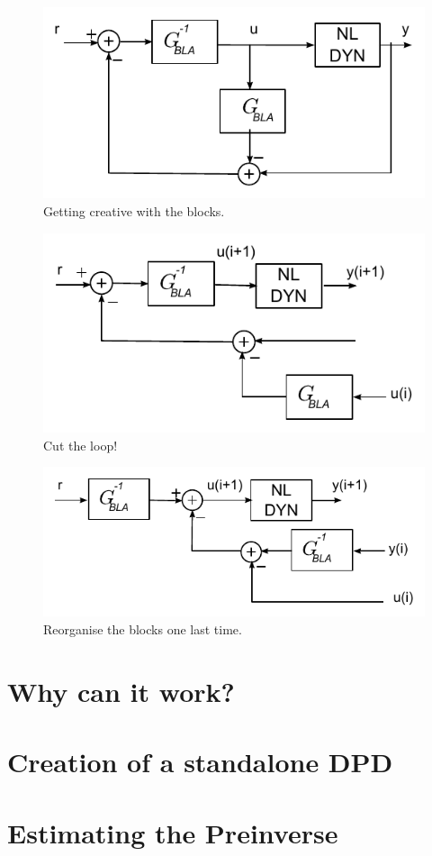 		\begin{figure}[hbtp]
			\centering
			\includegraphics[scale=0.7]{images/lego4}
			\caption{Getting creative with the blocks. }
		\end{figure}

		\begin{figure}[hbtp]
			\centering
			\includegraphics[scale=0.7]{images/lego5}
			\caption{Cut the loop! }
		\end{figure}

		\begin{figure}[hbtp]
			\centering
			\includegraphics[scale=0.7]{images/lego6}
			\caption{Reorganise the blocks one last time. }
		\end{figure}

\section{Why can it work?}
\section{Creation of a standalone DPD}
\section{Estimating the Preinverse}